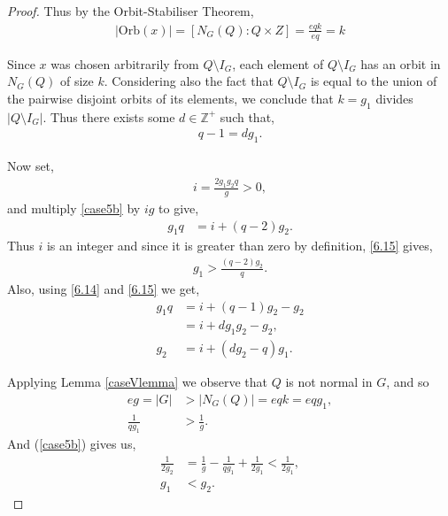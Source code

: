 \documentclass[a4paper , 11pt]{book}
\theoremstyle{definition}
\theoremstyle{remark}
\begin{document}
\begin{proof}
Thus by the Orbit-Stabiliser Theorem,
\begin{align*} |\text{Orb}(x)| = [N_G(Q) : Q \times Z] = \frac{eqk}{eq} = k
\end{align*}

Since $x$ was chosen arbitrarily from $Q \! \setminus \! I_G$, each element of $Q \! \setminus \! I_G$ has an orbit in $N_G(Q)$ of size $k$. Considering also the fact that $Q \! \setminus \! I_G$ is equal to the union of the pairwise disjoint orbits of its elements, we conclude that $k = g_1$ divides $|Q \! \setminus \! I_G|$. Thus there exists some $d \in \mathbb{Z^+}$ such that,
\begin{align}\label{6.14} q-1 = d g_1.
\end{align}

Now set,
\begin{align} \label{6.14a} i = \frac{2 g_1 g_2 q}{g} > 0,
\end{align}
and multiply \eqref{case5b} by $ig$ to give,
\begin{align}\label{6.15} g_1 q &= i + (q-2) g_2.
\end{align}
Thus $i$ is an integer and since it is greater than zero by definition, \eqref{6.15} gives,
\begin{align}\label{6.16b} g_1 > \frac{(q-2) g_2}{q}.
\end{align}
Also, using \eqref{6.14} and \eqref{6.15} we get,
\begin{align}\label{6.16a} g_1 q &= i + (q-1) g_2 - g_2 \nonumber
\\ &= i + d g_1 g_2 - g_2, \nonumber
\\ g_2 &= i + (d g_2 - q) g_1.
\end{align}

Applying Lemma \ref{caseVlemma} we observe that $Q$ is not normal in $G$, and so 
\begin{align*} eg = |G| &> |N_G(Q)| = eqk = eqg_1, \\[1.5ex]
\frac{1}{qg_1} &> \frac{1}{g}.
\end{align*}
And (\ref{case5b}) gives us,
\begin{align}\label{6.13}  \frac{1}{2g_2} &= \frac{1}{g} - \frac{1}{qg_1} + \frac{1}{2g_1} < \frac{1}{2g_1}, \nonumber
\\[1.5ex] g_1 &< g_2.
\end{align}


\end{proof}
\end{document}
